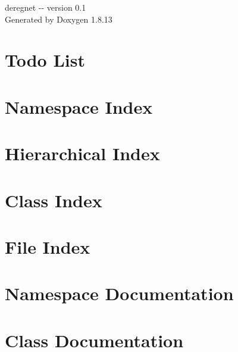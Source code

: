 \documentclass[twoside]{book}
\newcommand{\+}{\discretionary{\mbox{\scriptsize$\hookleftarrow$}}{}{}}
\newcommand{\clearemptydoublepage}{%
  \newpage{\pagestyle{empty}\cleardoublepage}%
}
\begin{document}
\hypersetup{pageanchor=false,
             bookmarksnumbered=true,
             pdfencoding=unicode
            }
\begin{titlepage}
\vspace*{7cm}
\begin{center}%
{\Large deregnet -\/-\/ version 0.1 }\\
\vspace*{1cm}
{\large Generated by Doxygen 1.8.13}\\
\end{center}
\end{titlepage}
\clearemptydoublepage
{}
\tableofcontents
\clearemptydoublepage
{}
\hypersetup{pageanchor=true}

\chapter{Todo List}
\label{todo}

\chapter{Namespace Index}

\chapter{Hierarchical Index}

\chapter{Class Index}

\chapter{File Index}

\chapter{Namespace Documentation}

\chapter{Class Documentation}


















\end{document}

